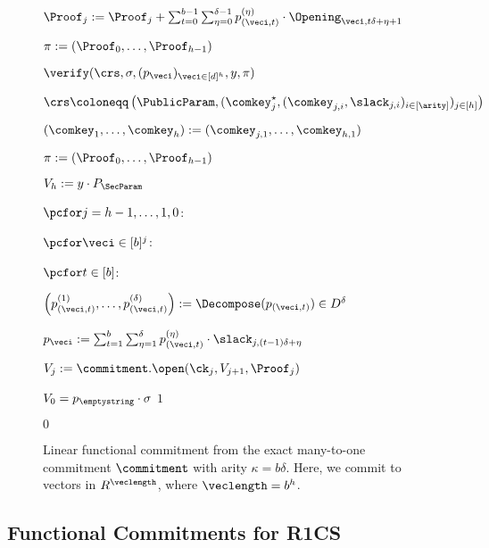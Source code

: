 \begin{figure}[t]
{{\begin{minipage}[t]{0.55\textwidth}
\begin{algorithmic}[1]
						\item \quad \quad $\Proof_j := \Proof_j +  \sum_{t=0}^{b-1} \sum^{\delta-1}_{\eta = 0} p^{(\eta)}_{(\veci,t)} \cdot \Opening_{\veci,t\delta+ \eta+1} $
						\item \Return $\pi := (\Proof_0,\ldots,\Proof_{h-1})$
					\end{algorithmic}
					\underline{$\verify(\crs, \sigma, (p_{\veci})_{\veci \in [d]^h} ,  y, \pi)$}
					\begin{algorithmic}[1]
     					\item $\crs \coloneqq \left(\PublicParam, (\comkey^\star_j,(\comkey_{j,i},\slack_{j,i})_{i\in [\arity]})_{j \in [h]} \right)$
                        \item $(\comkey_1,\ldots,\comkey_h) := (\comkey_{j,1},\ldots,\comkey_{h,1})$
						\item $\pi := (\Proof_0,\ldots,\Proof_{h-1})$
						\item $V_h := y \cdot P_\SecParam$
						\item $\pcfor j = h-1,\ldots,1,0$:
						\item \quad $\pcfor \veci \in [b]^j$:
						\item \quad \quad $\pcfor t \in [b]$:
						\item \quad \quad \quad  $\left(p^{(1)}_{(\veci,t)}, \ldots,  p^{(\delta)}_{(\veci,t)}\right) := \Decompose(p_{(\veci,t)}) \in D^{\delta}$
						\item \quad \quad $p_\veci := \sum_{t=1}^{b} \sum^{\delta}_{\eta = 1} p^{(\eta)}_{(\veci,t)} \cdot \slack_{j,(t-1)\delta + \eta}$
						\item \quad $V_{j} := \commitment.\open(\ck_j, V_{j+1}, \Proof_j)$
						\item \pcif $V_0 = p_\emptystring \cdot \sigma$ \pcthen \pcreturn $1$
						\item \pcelse \pcreturn $0$
					\end{algorithmic}
				\end{minipage}
		}}
		\caption{Linear functional commitment from the exact many-to-one commitment $\commitment$ with arity $\kappa = b \delta$. Here, we commit to vectors in $R^\veclength$, where $\veclength = b^h$.}\label{fig:linfunccommitment}
	\end{figure}
	
	\subsection{Functional Commitments for R1CS}
	

